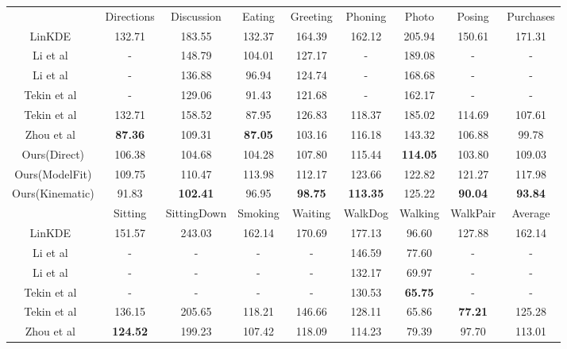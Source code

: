 \documentclass[runningheads]{llncs}
\begin{document}
\setlength{\tabcolsep}{2pt}
\begin{table}

\scriptsize
\begin{center}
\begin{tabular}{ccccccccc}
\hline\noalign{\smallskip}
 & Directions & Discussion & Eating & Greeting & Phoning & Photo & Posing & Purchases\\
\noalign{\smallskip}
\hline
\noalign{\smallskip}
LinKDE~\cite{h36m_pami} & 132.71 & 183.55 & 132.37 & 164.39 & 162.12 & 205.94 & 150.61 & 171.31\\
Li et al~\cite{li20143d} & - & 148.79 & 104.01 & 127.17 & - & 189.08 & - & - \\
Li et al~\cite{Li_2015_ICCV} & - & 136.88 & 96.94 & 124.74 & - & 168.68 & - & - \\
Tekin et al~\cite{tekin2016structured} & - & 129.06 & 91.43 & 121.68 & - & 162.17 & - & - \\
Tekin et al~\cite{Tekin_2016_CVPR} & 132.71 & 158.52 & 87.95 & 126.83 & 118.37 & 185.02 & 114.69 & 107.61\\
Zhou et al~\cite{Zhou_2016_CVPR} & \bf 87.36 & 109.31 & \bf 87.05 & 103.16 & 116.18 & 143.32 & 106.88 & 99.78\\
Ours(Direct) & 106.38 & 104.68 & 104.28 & 107.80 & 115.44 & \bf 114.05 & 103.80 & 109.03 \\
Ours(ModelFit) & 109.75 & 110.47 & 113.98 & 112.17 & 123.66 & 122.82 & 121.27 & 117.98 \\
Ours(Kinematic) & 91.83 & \bf 102.41 & 96.95 & \bf 98.75 & \bf 113.35 & 125.22 & \bf 90.04 & \bf 93.84 \\
\hline\noalign{\smallskip}
 & Sitting & SittingDown & Smoking & Waiting & WalkDog & Walking & WalkPair & Average\\
\noalign{\smallskip}
\hline
\noalign{\smallskip}
LinKDE~\cite{h36m_pami} & 151.57 & 243.03 & 162.14 & 170.69 & 177.13 & 96.60 & 127.88 & 162.14\\
Li et al~\cite{li20143d} & - & - & - & - & 146.59 & 77.60 & - & - \\
Li et al~\cite{Li_2015_ICCV} & - & - & - & - & 132.17 & 69.97 & - & - \\
Tekin et al~\cite{tekin2016structured} & - & - & - & - & 130.53 & \bf 65.75 & - & - \\
Tekin et al~\cite{Tekin_2016_CVPR} & 136.15 & 205.65 & 118.21 & 146.66 & 128.11 & 65.86 & \bf 77.21 & 125.28\\
Zhou et al~\cite{Zhou_2016_CVPR} &\bf 124.52 & 199.23 & 107.42 & 118.09 & 114.23 & 79.39 & 97.70 & 113.01\\

\end{tabular}
\end{center}
\end{table}
\end{document}
